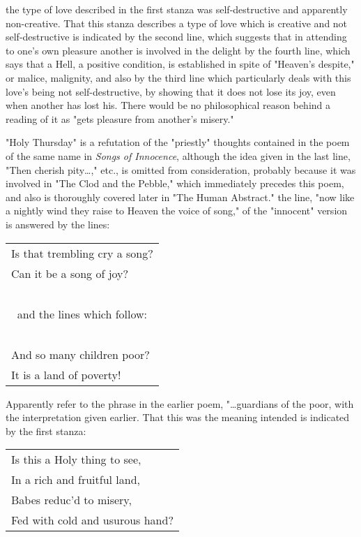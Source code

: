\noindent the type of love described in the first stanza was self-destructive and apparently non-creative. That this stanza
describes a type of love which is creative and not self-destructive is indicated by the second line, which suggests
that in attending to one's own pleasure another is involved in the delight by the fourth line, which says that
a Hell, a positive condition, is established in spite of "Heaven's despite," or malice, malignity, and also
by the third line which particularly deals with this love's being not self-destructive, by showing that it does
not lose its joy, even when another has lost his. There would be no philosophical reason behind a reading of it as "gets
pleasure from another's misery."\par
\vspace*{0.5\baselineskip}
"Holy Thursday" is a refutation of the "priestly" thoughts contained in the poem of the
same name in \textit{Songs of Innocence}, although the idea given in the last line, "Then cherish pity\dots," etc., is omitted from consideration,
probably because it was involved in "The Clod and the Pebble," which immediately precedes this poem, and also is thoroughly
covered later in "The Human Abstract." the line, "now like a nightly wind they raise to Heaven the voice of song," of the "innocent"
version is answered by the lines:\par
\begin{center}
	\begin{tabular}{l}
		Is that trembling cry a song?                   \\
		Can it be a song of joy?                        \\
		~                                               \\
		\multicolumn{1}{c}{and the lines which follow:} \\
		~                                               \\
		And so many children poor?                      \\
		It is a land of poverty!
	\end{tabular}
\end{center}
\hspace*{5mm}Apparently refer to the phrase in the earlier poem, "\dots guardians of the poor,
with the interpretation given earlier. That this was the meaning intended is indicated by the
first stanza:\par
\begin{center}
	\begin{tabular}{l}
		Is this a Holy thing to see, \\
		In a rich and fruitful land, \\
		Babes reduc'd to misery,     \\
		Fed with cold and usurous hand?
	\end{tabular}
\end{center}

